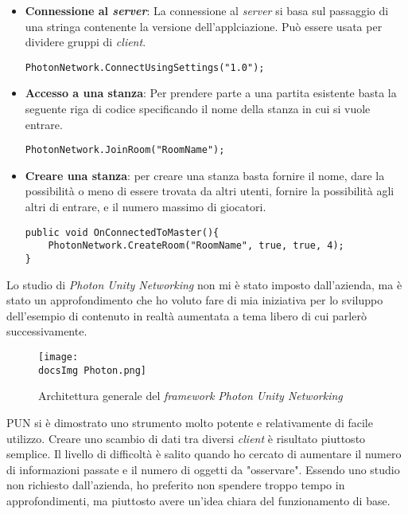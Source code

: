 \begin{itemize}
	\item \textbf{Connessione al \textit{server}}: La connessione al \textit{server} si basa sul passaggio di una stringa contenente la versione dell'applciazione. Pu\`o essere usata per dividere gruppi di \textit{client}.
\begin{lstlisting}
PhotonNetwork.ConnectUsingSettings("1.0");
\end{lstlisting}

	\item \textbf{Accesso a una stanza}: Per prendere parte a una partita esistente basta la seguente riga di codice specificando il nome della stanza in cui si vuole entrare.
\begin{lstlisting}
PhotonNetwork.JoinRoom("RoomName");
\end{lstlisting}

	\item \textbf{Creare una stanza}: per creare una stanza basta fornire il nome, dare la possibilit\`a o meno di essere trovata da altri utenti, fornire la possibilit\`a agli altri di entrare, e il numero massimo di giocatori.
\begin{lstlisting}
public void OnConnectedToMaster(){
	PhotonNetwork.CreateRoom("RoomName", true, true, 4);
}

\end{lstlisting}	
	
\end{itemize}

Lo studio di \textit{Photon Unity Networking} non mi \`e stato imposto dall'azienda, ma \`e stato un approfondimento che ho voluto fare di mia iniziativa per lo sviluppo dell'esempio di contenuto in realt\`a aumentata a tema libero di cui parler\`o successivamente.

\begin{figure}[H]
	\centering
	\texttt{[image: \\docsImg Photon.png]}
	\caption{Architettura generale del \textit{framework Photon Unity Networking}}
	\label{fig:Architettura generale del framework Photon Unity Networking}
\end{figure}

PUN si \`e dimostrato uno strumento molto potente e relativamente di facile utilizzo. Creare uno scambio di dati tra diversi \textit{client} \`e risultato piuttosto semplice. Il livello di difficolt\`a \`e salito quando ho cercato di aumentare il numero di informazioni passate e il numero di oggetti da "osservare". Essendo uno studio non richiesto dall'azienda, ho preferito non spendere troppo tempo in approfondimenti, ma piuttosto avere un'idea chiara del funzionamento di base.

